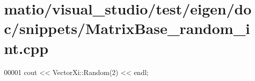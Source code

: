 \hypertarget{matio_2visual__studio_2test_2eigen_2doc_2snippets_2_matrix_base__random__int_8cpp_source}{}\section{matio/visual\+\_\+studio/test/eigen/doc/snippets/\+Matrix\+Base\+\_\+random\+\_\+int.cpp}
\label{matio_2visual__studio_2test_2eigen_2doc_2snippets_2_matrix_base__random__int_8cpp_source}

\begin{DoxyCode}
00001 cout << VectorXi::Random(2) << endl;
\end{DoxyCode}
